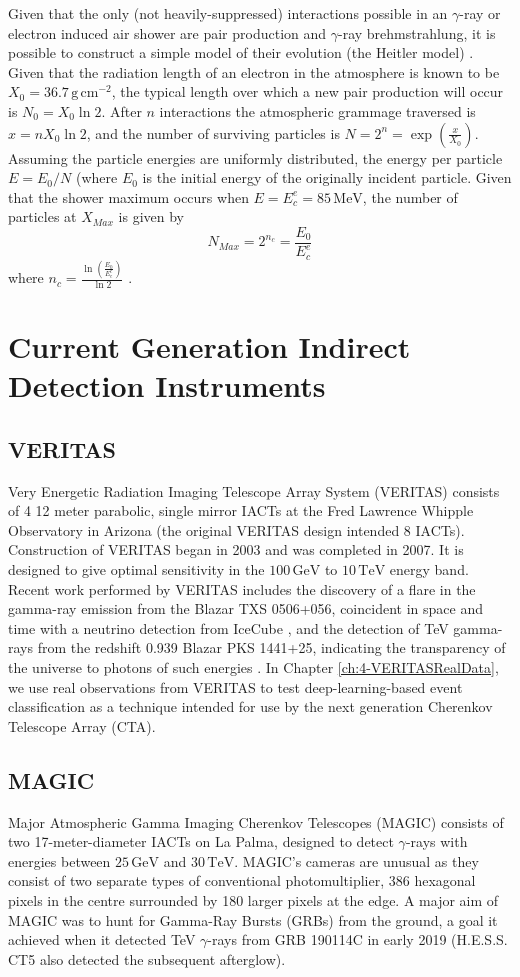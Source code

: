 Given that the only (not heavily-suppressed) interactions possible in an $\gamma$-ray or electron induced air shower are pair production and $\gamma$-ray brehmstrahlung, it is possible to construct a simple model of their evolution (the Heitler model) \cite{heitler}. Given that the radiation length of an electron in the atmosphere is known to be $X_0=\mathrm{36.7\,g\,cm^{-2}}$, the typical length over which a new pair production will occur is $N_0=X_0 \ln 2$. After $n$ interactions the atmospheric grammage traversed is $x=nX_0 \ln 2$, and the number of surviving particles is $N=2^n=\exp \left( \frac{x}{X_0}\right)$. Assuming the particle energies are uniformly distributed, the energy per particle $E=E_0/N$ (where $E_0$ is the initial energy of the originally incident particle. Given that the shower maximum occurs when $E=E_c^e=\mathrm{85\,MeV}$, the number of particles at $X_{Max}$ is given by 
\begin{equation}
    N_{Max}=2^{n_c}=\frac{E_0}{E_c^e}
\end{equation}
where $n_c=\frac{\ln (\frac{E_0}{E_e^c})}{\ln 2}$ \cite{heitler}.

\section{Current Generation Indirect Detection Instruments}
\subsection{VERITAS}
Very Energetic Radiation Imaging Telescope Array System (VERITAS) consists of 4 12 meter parabolic, single mirror IACTs at the Fred Lawrence Whipple Observatory in Arizona (the original VERITAS design intended 8 IACTs). Construction of VERITAS began in 2003 and was completed in 2007. It is designed to give optimal sensitivity in the $\mathrm{100\,GeV}$ to $\mathrm{10\,TeV}$ energy band. Recent work performed by VERITAS includes the discovery of a flare in the gamma-ray emission from the Blazar TXS 0506+056, coincident in space and time with a neutrino detection from IceCube \cite{TXS}, and the detection of TeV gamma-rays from the redshift 0.939 Blazar PKS 1441+25, indicating the transparency of the universe to photons of such energies \cite{escape}. In Chapter \ref{ch:4-VERITASRealData}, we use real observations from VERITAS to test deep-learning-based event classification as a technique intended for use by the next generation Cherenkov Telescope Array (CTA).

\subsection{MAGIC}
Major Atmospheric Gamma Imaging Cherenkov Telescopes (MAGIC) consists of two 17-meter-diameter IACTs on La Palma, designed to detect $\gamma$-rays with energies between $\mathrm{25\,GeV}$ and $\mathrm{30\,TeV}$. MAGIC's cameras are unusual as they consist of two separate types of conventional photomultiplier, 386 hexagonal pixels in the centre surrounded by 180 larger pixels at the edge. A major aim of MAGIC was to hunt for Gamma-Ray Bursts (GRBs) from the ground, a goal it achieved when it detected TeV $\gamma$-rays from GRB 190114C in early 2019 \cite{magicGRB} (H.E.S.S. CT5 also detected the subsequent afterglow).
